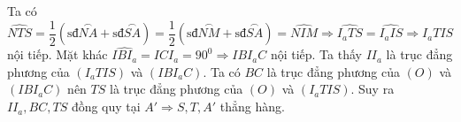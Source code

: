 \begin{bt}
{\begin{center}
		\end{center}
		Ta có $\widehat{NTS}=\dfrac{1}{2}\left( \text{sđ}\overset\frown{NA}+\text{sđ}\overset\frown{SA} \right)=\dfrac{1}{2}\left( \text{sđ}\overset\frown{NM}+\text{sđ}\overset\frown{SA} \right)=\widehat{NIM}\Rightarrow \widehat{{{I}_{a}}TS}=\widehat{{{I}_{a}}IS}\Rightarrow {{I}_{a}}TIS$ nội tiếp.
		Mặt khác $\widehat{IB{{I}_{a}}}=\widehat{IC{{I}_{a}}}={{90}^{0}}\Rightarrow IB{{I}_{a}}C$ nội tiếp. Ta thấy $I{{I}_{a}}$ là trục đẳng phương của $\left( {{I}_{a}}TIS \right)$ và $\left( IB{{I}_{a}}C \right)$. Ta có $BC$ là trục đẳng phương của $\left( O \right)$ và $\left( IB{{I}_{a}}C \right)$ nên $TS$ là trục đẳng phương của $\left( O \right)$ và $\left( {{I}_{a}}TIS \right)$. Suy ra $I{{I}_{a}},BC,TS$ đồng quy tại ${A}'\Rightarrow S,T,{A}'$ thẳng hàng.
		
	}
\end{bt}

